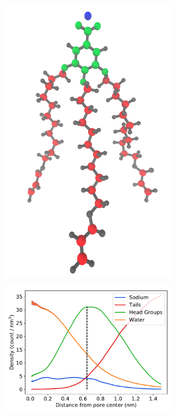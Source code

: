 \documentclass{article}
\begin{document}
\begin{figure}[!htb]
\begin{subfigure}{0.15\textwidth}
  \includegraphics[width=\textwidth]{monomer_color_coded.pdf}
  \label{fig:monomer_color_coded}
  \end{subfigure}
  \begin{subfigure}{0.415\textwidth}
  \includegraphics[width=\textwidth]{component_density_10wt.pdf}

\end{subfigure}
\end{figure}
\end{document}
